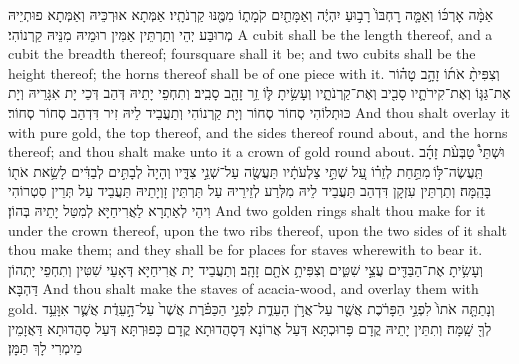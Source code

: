 {אַמָּ֨ה אׇרְכּ֜וֹ וְאַמָּ֤ה רׇחְבּוֹ֙ רָב֣וּעַ יִהְיֶ֔ה וְאַמָּתַ֖יִם קֹמָת֑וֹ מִמֶּ֖נּוּ קַרְנֹתָֽיו׃}
{אַמְּתָא אוּרְכֵּיהּ וְאַמְּתָא פוּתְיֵיהּ מְרוּבַּע יְהֵי וְתַרְתֵּין אַמִּין רוּמֵיהּ מִנֵּיהּ קַרְנוֹהִי׃}
{A cubit shall be the length thereof, and a cubit the breadth thereof; foursquare shall it be; and two cubits shall be the height thereof; the horns thereof shall be of one piece with it.}{}
{וְצִפִּיתָ֨ אֹת֜וֹ זָהָ֣ב טָה֗וֹר אֶת־גַּגּ֧וֹ וְאֶת־קִירֹתָ֛יו סָבִ֖יב וְאֶת־קַרְנֹתָ֑יו וְעָשִׂ֥יתָ לּ֛וֹ זֵ֥ר זָהָ֖ב סָבִֽיב׃
}
{וְתִחְפֵי יָתֵיהּ דְּהַב דְּכֵי יָת אִגָּרֵיהּ וְיָת כּוּתְלוֹהִי סְחוֹר סְחוֹר וְיָת קַרְנוֹהִי וְתַעֲבֵיד לֵיהּ זִיר דִּדְהַב סְחוֹר סְחוֹר׃}
{And thou shalt overlay it with pure gold, the top thereof, and the sides thereof round about, and the horns thereof; and thou shalt make unto it a crown of gold round about.}{}
{וּשְׁתֵּי֩ טַבְּעֹ֨ת זָהָ֜ב תַּֽעֲשֶׂה־לּ֣וֹ \legarmeh  מִתַּ֣חַת לְזֵר֗וֹ עַ֚ל שְׁתֵּ֣י צַלְעֹתָ֔יו תַּעֲשֶׂ֖ה עַל־שְׁנֵ֣י צִדָּ֑יו וְהָיָה֙ לְבָתִּ֣ים לְבַדִּ֔ים לָשֵׂ֥את אֹת֖וֹ בָּהֵֽמָּה׃
}
{וְתַרְתֵּין עִזְקָן דִּדְהַב תַּעֲבֵיד לֵיהּ מִלְּרַע לְזֵירֵיהּ עַל תַּרְתֵּין זָוְיָתֵיהּ תַּעֲבֵיד עַל תְּרֵין סִטְרוֹהִי וִיהֵי לְאַתְרָא לַאֲרִיחַיָּא לְמִטַּל יָתֵיהּ בְּהוֹן׃}
{And two golden rings shalt thou make for it under the crown thereof, upon the two ribs thereof, upon the two sides of it shalt thou make them; and they shall be for places for staves wherewith to bear it.}{}
{וְעָשִׂ֥יתָ אֶת־הַבַּדִּ֖ים עֲצֵ֣י שִׁטִּ֑ים וְצִפִּיתָ֥ אֹתָ֖ם זָהָֽב׃}
{וְתַעֲבֵיד יָת אֲרִיחַיָּא דְּאָעֵי שִׁטִּין וְתִחְפֵי יָתְהוֹן דַּהְבָּא׃}
{And thou shalt make the staves of acacia-wood, and overlay them with gold.}{}
{וְנָתַתָּ֤ה אֹתוֹ֙ לִפְנֵ֣י הַפָּרֹ֔כֶת אֲשֶׁ֖ר עַל־אֲרֹ֣ן הָעֵדֻ֑ת לִפְנֵ֣י הַכַּפֹּ֗רֶת אֲשֶׁר֙ עַל־הָ֣עֵדֻ֔ת אֲשֶׁ֛ר אִוָּעֵ֥ד לְךָ֖ שָֽׁמָּה׃
}
{וְתִתֵּין יָתֵיהּ קֳדָם פָּרוּכְתָּא דְּעַל אֲרוֹנָא דְּסָהֲדוּתָא קֳדָם כָּפוּרְתָּא דְּעַל סָהֲדוּתָא דַּאֲזָמֵין מֵימְרִי לָךְ תַּמָּן׃}
